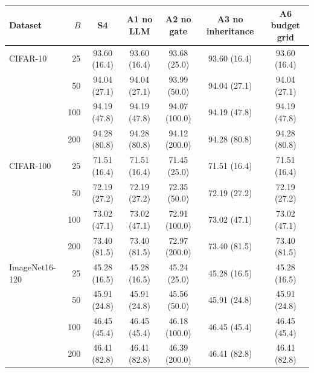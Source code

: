 \begin{tabular}{@{}lrccccc@{}}
\toprule
Dataset & $B$ & S4 \rmg{} & A1 no LLM & A2 no gate & A3 no inheritance & A6 budget grid\\
\midrule
CIFAR-10 & 25 & 93.60 (16.4) & 93.60 (16.4) & 93.68 (25.0) & 93.60 (16.4) & 93.60 (16.4)\\
 & 50 & 94.04 (27.1) & 94.04 (27.1) & 93.99 (50.0) & 94.04 (27.1) & 94.04 (27.1)\\
 & 100 & 94.19 (47.8) & 94.19 (47.8) & 94.07 (100.0) & 94.19 (47.8) & 94.19 (47.8)\\
 & 200 & 94.28 (80.8) & 94.28 (80.8) & 94.12 (200.0) & 94.28 (80.8) & 94.28 (80.8)\\
\midrule
CIFAR-100 & 25 & 71.51 (16.4) & 71.51 (16.4) & 71.45 (25.0) & 71.51 (16.4) & 71.51 (16.4)\\
 & 50 & 72.19 (27.2) & 72.19 (27.2) & 72.35 (50.0) & 72.19 (27.2) & 72.19 (27.2)\\
 & 100 & 73.02 (47.1) & 73.02 (47.1) & 72.91 (100.0) & 73.02 (47.1) & 73.02 (47.1)\\
 & 200 & 73.40 (81.5) & 73.40 (81.5) & 72.97 (200.0) & 73.40 (81.5) & 73.40 (81.5)\\
\midrule
ImageNet16-120 & 25 & 45.28 (16.5) & 45.28 (16.5) & 45.24 (25.0) & 45.28 (16.5) & 45.28 (16.5)\\
 & 50 & 45.91 (24.8) & 45.91 (24.8) & 45.56 (50.0) & 45.91 (24.8) & 45.91 (24.8)\\
 & 100 & 46.45 (45.4) & 46.45 (45.4) & 46.18 (100.0) & 46.45 (45.4) & 46.45 (45.4)\\
 & 200 & 46.41 (82.8) & 46.41 (82.8) & 46.39 (200.0) & 46.41 (82.8) & 46.41 (82.8)\\
\bottomrule
\end{tabular}
